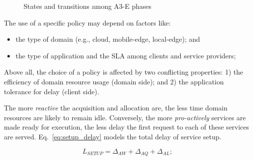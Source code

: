 \begin{figure}[htbp]
	\raggedright
	\hfill
	
	\hfill
	\caption{States and transitions among A3-E phases} \label{fig:A3-E-phases}
\end{figure}

The use of a specific policy may depend on factors like:

\begin{itemize}

\item the type of domain (e.g., cloud, mobile-edge, local-edge); and

\item the type of application and the SLA among clients and service  providers;

\end{itemize}

Above all, the choice of a policy is affected by two conflicting properties: 1) the efficiency of domain resource usage (domain side); and 2) the application tolerance for delay (client side). 

The more \textit{reactive} the acquisition and allocation are, the less time domain resources are likely to remain idle. Conversely, the more \textit{pro-actively} services are made ready for execution, the less delay the first request to each of these services are served. Eq.~\ref{eq:setup_delay} models the total delay of service setup.

\begin{equation}\label{eq:setup_delay}
L_{SETUP} = \Delta_{AW} + \Delta_{AQ} + \Delta_{AL};
\end{equation}

